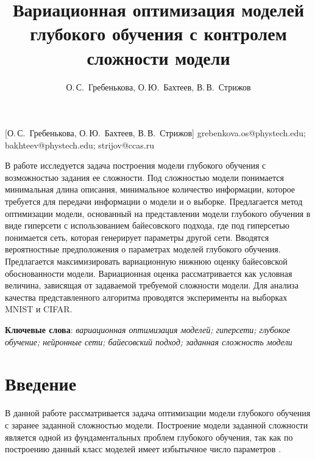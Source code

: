 \documentclass[12pt, twoside]{article}
\begin{document}
\title
    [Вариационная оптимизация моделей глубокого обучения с контролем сложности модели] %
    {Вариационная оптимизация моделей глубокого обучения с контролем сложности модели}
\author
    [О.\,С.~Гребенькова, О.\,Ю.~Бахтеев, В.\,В.~Стрижов] %
    {О.\,С.~Гребенькова, О.\,Ю.~Бахтеев, В.\,В.~Стрижов} %
    [О.\,С.~Гребенькова, О.\,Ю.~Бахтеев, В.\,В.~Стрижов] %
\email
    { grebenkova.os@phystech.edu; bakhteev@phystech.edu; strijov@ccas.ru}

\abstract
    {В работе исследуется задача построения модели глубокого обучения с возможностью задания ее сложности. Под сложностью модели понимается минимальная длина описания, минимальное количество информации, которое требуется для передачи информации о модели и о выборке. Предлагается метод оптимизации модели, основанный на представлении модели глубокого обучения в виде гиперсети с использованием байесовского подхода, где под гиперсетью понимается сеть, которая генерирует параметры другой сети. Вводятся вероятностные предположения о параметрах моделей глубокого обучения. Предлагается максимизировать вариационную нижнюю оценку байесовской обоснованности модели. Вариационная оценка рассматривается как условная величина, зависящая от задаваемой требуемой сложности модели. Для анализа качества представленного алгоритма проводятся эксперименты на выборках MNIST и CIFAR.

	
\bigskip
\noindent
\textbf{Ключевые слова}: \emph {вариационная оптимизация моделей; гиперсети; глубокое обучение; нейронные сети; байесовский подход; заданная сложность модели}
}





\maketitle
\linenumbers

\section{Введение}
В данной работе рассматривается задача оптимизации модели глубокого обучения с заранее заданной сложностью модели. Построение модели заданной сложности является одной из фундаментальных проблем глубокого обучения, так как по построению данный класс моделей имеет избытычное число параметров \cite{conf/nips/Graves11}.
\end{document}
